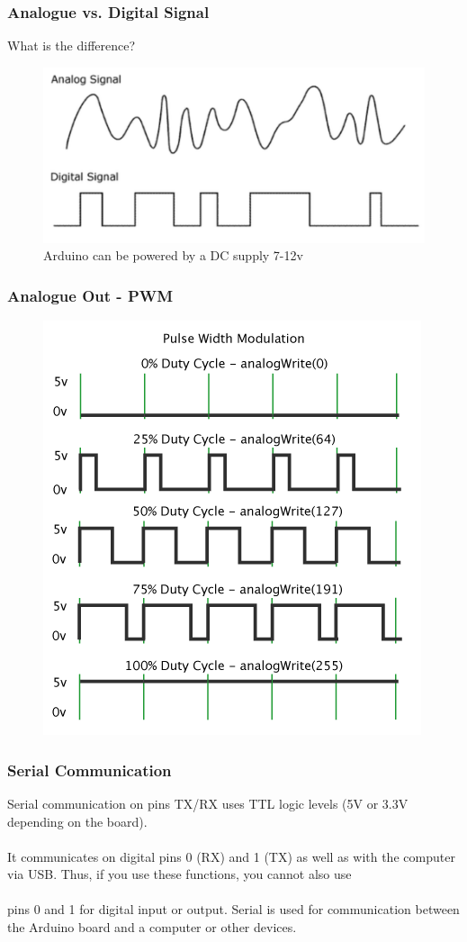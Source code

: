 \begin{frame}
	\frametitle{Analogue vs. Digital Signal}
	What is the difference? 
	
	\pause
	 \begin{figure}
		\includegraphics[scale=.25]{assets/dva} 
		\caption{Arduino can be powered by a DC supply 7-12v}

	\end{figure}
\end{frame}

\begin{frame}
	\frametitle{Analogue Out - PWM}
	\begin{figure}
   		\includegraphics[scale=.4]{assets/pwm} 
	\end{figure}
\end{frame}

\begin{frame}
	\frametitle{Serial Communication}
	Serial communication on pins TX/RX uses TTL logic levels (5V or 3.3V depending on the board). \\~\\
	It communicates on digital pins 0 (RX) and 1 (TX) as well as with the computer via USB. Thus, if you use these functions, you cannot also use \\~\\pins 0 and 1 for digital input or output. 
	Serial is used for communication between the Arduino board and a computer or other devices. 
	
\end{frame}

